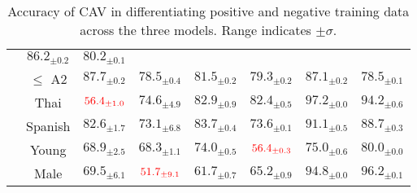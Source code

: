 \begin{table}[H]
\begin{tabular}{|c|c|cc|cc|cc|}
                          & \multicolumn{1}{c|}{$86.2_{\pm 0.2}$}                  & $80.2_{\pm 0.1}$                                                                           \\
                          & $\leq$ A2                                              & \multicolumn{1}{c|}{$87.7_{\pm 0.2}$}                  & $78.5_{\pm 0.4}$
                          & \multicolumn{1}{c|}{$81.5_{\pm 0.2}$}                  & $79.3_{\pm 0.2}$
                          & \multicolumn{1}{c|}{$87.1_{\pm 0.2}$}                  & $78.5_{\pm 0.1}$                                                                           \\ \cline{2-8}
                          & Thai                                                   & \multicolumn{1}{c|}{$\textcolor{red}{56.4_{\pm 1.0}}$} & $74.6_{\pm 4.9}$
                          & \multicolumn{1}{c|}{$82.9_{\pm 0.9}$}                  & $82.4_{\pm 0.5}$
                          & \multicolumn{1}{c|}{$97.2_{\pm 0.0}$}                  & $94.2_{\pm 0.6}$                                                                           \\
                          & Spanish                                                & \multicolumn{1}{c|}{$82.6_{\pm 1.7}$}                  & $73.1_{\pm 6.8}$
                          & \multicolumn{1}{c|}{$83.7_{\pm 0.4}$}                  & $73.6_{\pm 0.1}$
                          & \multicolumn{1}{c|}{$91.1_{\pm 0.5}$}                  & $88.7_{\pm 0.3}$                                                                           \\ \cline{2-8}
                          & Young                                                  & \multicolumn{1}{c|}{$68.9_{\pm 2.5}$}                  & $68.3_{\pm 1.1}$
                          & \multicolumn{1}{c|}{$74.0_{\pm 0.5}$}                  & $\textcolor{red}{56.4_{\pm 0.3}}$
                          & \multicolumn{1}{c|}{$75.0_{\pm 0.6}$}                  & $80.0_{\pm 0.0}$                                                                           \\ \cline{2-8}
                          & Male                                                   & \multicolumn{1}{c|}{$69.5_{\pm 6.1}$}                  & $\textcolor{red}{51.7_{\pm 9.1}}$
                          & \multicolumn{1}{c|}{$61.7_{\pm 0.7}$}                  & $65.2_{\pm 0.9}$
                          & \multicolumn{1}{c|}{$94.8_{\pm 0.0}$}                  & $96.2_{\pm 0.1}$                                                                           \\ \hline
    \end{tabular}
    \caption{Accuracy of CAV in differentiating positive and negative training data across the three models. Range indicates $\pm \sigma$.}
    \label{tab:CAV_accuracy_combined}
\end{table}

